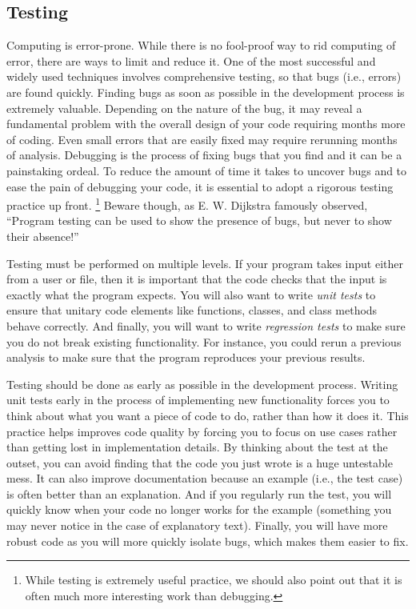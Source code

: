 \documentclass[ChapterTOCs,krantz2]{krantz} %
\begin{document}
\subsection{Testing}

Computing is error-prone. While there is no
fool-proof way to rid computing of error, there are ways to limit and reduce
it. One of the most successful and widely used techniques involves
comprehensive testing, so that bugs (i.e., errors) are found quickly. Finding
bugs as soon as possible in the development process is extremely valuable.
Depending on the nature of the bug, it may reveal a fundamental problem with
the overall design of your code requiring months more of coding.  Even small
errors that are easily fixed may require rerunning months of analysis.
Debugging is the process of fixing bugs that you find and it can be a
painstaking ordeal. To reduce the amount of time it takes to uncover bugs and
to ease the pain of debugging your code, it is essential to adopt a rigorous
testing practice up front.%
\footnote{While testing is extremely useful
practice, we should also point out that it is often much more interesting work
than debugging.} Beware though, as E. W. Dijkstra famously observed, ``Program
testing can be used to show the presence of bugs, but never to show their
absence!'' \cite{dahl1972structured}

Testing must be performed on multiple levels. If your program takes input
either from a user or file, then it is important that the code checks that the
input is exactly what the program expects. You will also want to write
\emph{unit tests} to ensure that unitary code elements like functions, classes,
and class methods behave correctly. And finally, you will want to write
\emph{regression tests} to make sure you do not break existing functionality.
For instance, you could rerun a previous analysis to make sure that the program
reproduces your previous results.

Testing should be done as early as possible in the development process.
Writing unit tests early in the process of implementing new functionality
forces you to think about what you want a piece of code to do, rather than how
it does it. This practice helps improves code quality by forcing you to focus
on use cases rather than getting lost in implementation details. By thinking
about the test at the outset, you can avoid finding that the code you just
wrote is a huge untestable mess. It can also improve documentation because an
example (i.e., the test case) is often better than an explanation. And if you
regularly run the test, you will quickly know when your code no longer works
for the example (something you may never notice in the case of explanatory
text). Finally, you will have more robust code as you will more quickly
isolate bugs, which makes them easier to fix.\cite{oram2010making}
\end{document}
